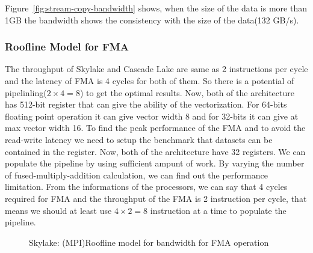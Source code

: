 \documentclass[conference, 10ppt]{IEEEtran}
\begin{document}
Figure~\ref{fig:stream-copy-bandwidth} shows, when the size of the data is more than 1GB the bandwidth shows the consistency 
with the size of the data(132 GB/s).


\subsubsection{Roofline Model for FMA}
The throughput of Skylake and Cascade Lake are same as 2 instructions per cycle and the latency of FMA is 4 cycles for both of them. So there is a potential of pipelinling($2\times 4 = 8$) to get the optimal results. Now, both of the architecture 
has 512-bit register that can give the ability of the vectorization. For 64-bits floating point operation it can give vector 
width 8 and for 32-bits it can give at max vector width 16. To find the peak performance of the FMA and to avoid the 
read-write latency we need to setup the benchmark that datasets can be contained in the register. Now, both of the 
architecture have 32 registers. We can populate the pipeline by using sufficient ampunt of work. By varying the 
number of fused-multiply-addition calculation, we can find out the performance limitation. From the informations of the 
processors, we can say that 4 cycles required for FMA and the throughput of the FMA is 2 instruction per cycle, that means 
we should at least use $4\times 2=8$ instruction at a time to populate the pipeline.

\begin{figure}[hbt!]
	\centering
	\caption{Skylake: (MPI)Roofline model for bandwidth for FMA operation}
	\label{fig:mpi-skl-roofline}
\end{figure}
\end{document}
